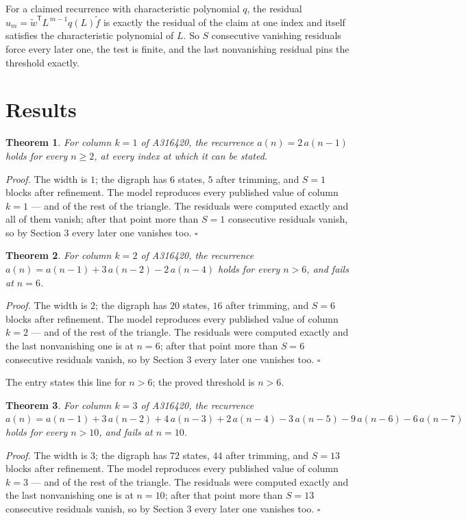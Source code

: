 \documentclass[11pt]{article}
\newtheorem{theorem}{Theorem}
\theoremstyle{definition}
\begin{document}
For a claimed recurrence with characteristic polynomial $q$, the residual $u_m = \tilde w^{\mathsf T}L^{\,m-1}q(L)\tilde f$ is exactly the residual of the claim at one index and itself satisfies the characteristic polynomial of $L$. So $S$ consecutive vanishing residuals force every later one, the test is finite, and the last nonvanishing residual pins the threshold exactly.

\section{Results}

\begin{theorem} For column $k = 1$ of A316420, the recurrence $a(n) = 2\,a(n-1)$ holds for every $n \ge 2$, at every index at which it can be stated.\end{theorem}

{\itshape Proof.} The width is $1$; the digraph has $6$ states, $5$ after trimming, and $S = 1$ blocks after refinement. The model reproduces every published value of column $k = 1$ --- and of the rest of the triangle. The residuals were computed exactly and all of them vanish; after that point more than $S = 1$ consecutive residuals vanish, so by Section 3 every later one vanishes too. $\square$

\begin{theorem} For column $k = 2$ of A316420, the recurrence $a(n) = a(n-1) + 3\,a(n-2) - 2\,a(n-4)$ holds for every $n > 6$, and fails at $n = 6$.\end{theorem}

{\itshape Proof.} The width is $2$; the digraph has $20$ states, $16$ after trimming, and $S = 6$ blocks after refinement. The model reproduces every published value of column $k = 2$ --- and of the rest of the triangle. The residuals were computed exactly and the last nonvanishing one is at $n = 6$; after that point more than $S = 6$ consecutive residuals vanish, so by Section 3 every later one vanishes too. $\square$

The entry states this line for $n > 6$; the proved threshold is $n > 6$.

\begin{theorem} For column $k = 3$ of A316420, the recurrence $a(n) = a(n-1) + 3\,a(n-2) + 4\,a(n-3) + 2\,a(n-4) - 3\,a(n-5) - 9\,a(n-6) - 6\,a(n-7)$ holds for every $n > 10$, and fails at $n = 10$.\end{theorem}

{\itshape Proof.} The width is $3$; the digraph has $72$ states, $44$ after trimming, and $S = 13$ blocks after refinement. The model reproduces every published value of column $k = 3$ --- and of the rest of the triangle. The residuals were computed exactly and the last nonvanishing one is at $n = 10$; after that point more than $S = 13$ consecutive residuals vanish, so by Section 3 every later one vanishes too. $\square$
\end{document}
